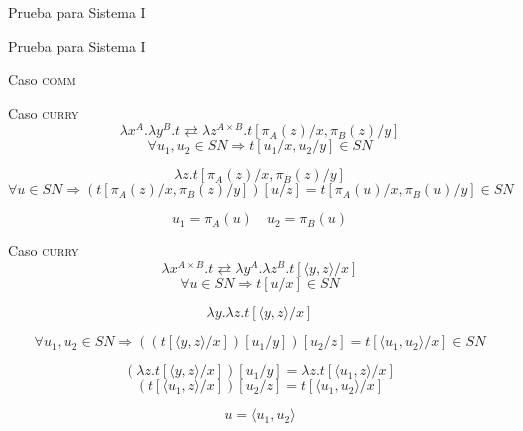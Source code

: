 \begin{frame}{Prueba para Sistema I}
	\pause
\end{frame}

\begin{frame}{Prueba para Sistema I}
\end{frame}

\begin{frame}{Caso \textsc{comm}}
\end{frame}

\begin{frame}{Caso \textsc{curry}}
	\[ \lambda x^A. \lambda y^B. t \rightleftarrows \lambda z^{A \times B}. t[\pi_A(z)/x, \pi_B(z)/y] \]
	\[ \forall u_1, u_2 \in SN \Longrightarrow t[u_1/x, u_2/y] \in SN \]
	
	\[ \lambda z. t[\pi_A(z)/x, \pi_B(z)/y]\]
	\[ \forall u \in SN \Longrightarrow (t[\pi_A(z)/x, \pi_B(z)/y])[u/z] = t[\pi_A(u)/x, \pi_B(u)/y] \in SN \]
	 
	\[ u_1 = \pi_A(u) \quad u_2 = \pi_B(u) \]
\end{frame}

\begin{frame}{Caso \textsc{curry}}
	\[ \lambda x^{A \times B}. t \rightleftarrows \lambda y^A. \lambda z^B. t[\langle y, z \rangle/x] \]
	\[ \forall u \in SN \Longrightarrow t[u/x] \in SN \]
	
	\[ \lambda y. \lambda z. t[\langle y, z \rangle/x]\]
	
	\[ \forall u_1,u_2 \in SN \Longrightarrow ((t[\langle y, z \rangle/x])[u_1/y])[u_2/z] = t[\langle u_1, u_2 \rangle/x] \in SN \]
	
	\[ (\lambda z. t[\langle y, z \rangle/x])[u_1/y] = \lambda z. t[\langle u_1, z \rangle/x] \]
	\[ (t[\langle u_1, z \rangle/x])[u_2/z] = t[\langle u_1, u_2 \rangle/x] \]
	
	\[ u = \langle u_1, u_2 \rangle \]
\end{frame}
